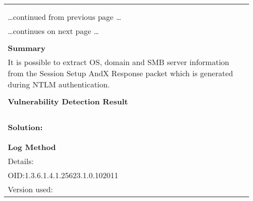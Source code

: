 \documentclass{article}
\begin{document}
\begin{longtable}{|p{}|}
\hline
\rowcolor{gvm_log}{\color{white}{Log (CVSS: 0.0) }}\\
\rowcolor{gvm_log}{\color{white}{NVT: SMB NativeLanMan}}\\
\hline
\endfirsthead
\hfill\ldots continued from previous page \ldots \\
\hline
\endhead
\hline
\ldots continues on next page \ldots \\
\endfoot
\hline
\endlastfoot
\\
\textbf{Summary}\\
It is possible to extract OS, domain and SMB server information
  from the Session Setup AndX Response packet which is generated during NTLM authentication.\\

        \hline
        \\
\textbf{Vulnerability Detection Result}\\
\rowcolor{white}{\verb=Detected SMB workgroup: DREAMBOX=}\\
\rowcolor{white}{\verb=Detected SMB server: Samba 4.6.2=}\\
\rowcolor{white}{\verb=Detected OS: Linux/Unix=}\\

          \hline
          \\
\textbf{Solution:}\\
\\


        \hline
        \\
\textbf{Log Method}\\
Details:
\rowcolor{white}{\verb=SMB NativeLanMan=}\\
OID:1.3.6.1.4.1.25623.1.0.102011\\
Version used:
\rowcolor{white}{\verb=2021-09-06T06:22:50Z=}\\
\end{longtable}
\end{document}

